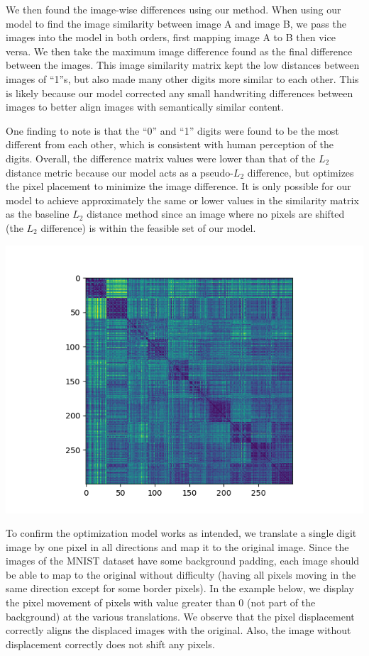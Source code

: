 \documentclass[11pt]{article}
\begin{document}
We then found the image-wise differences using our method. When using
our model to find the image similarity between image A and image B, we
pass the images into the model in both orders, first mapping image A to
B then vice versa. We then take the maximum image difference found as
the final difference between the images. This image similarity matrix
kept the low distances between images of ``1''s, but also made many
other digits more similar to each other. This is likely because our
model corrected any small handwriting differences between images to
better align images with semantically similar content.

One finding to note is that the ``0'' and ``1'' digits were found to be
the most different from each other, which is consistent with human
perception of the digits. Overall, the difference matrix values were
lower than that of the \(L_2\) distance metric because our model acts as
a pseudo-\(L_2\) difference, but optimizes the pixel placement to
minimize the image difference. It is only possible for our model to
achieve approximately the same or lower values in the similarity matrix
as the baseline \(L_2\) distance method since an image where no pixels
are shifted (the \(L_2\) difference) is within the feasible set of our
model.

\includegraphics{optimization_similarity_matrix.png}

To confirm the optimization model works as intended, we translate a
single digit image by one pixel in all directions and map it to the
original image. Since the images of the MNIST dataset have some
background padding, each image should be able to map to the original
without difficulty (having all pixels moving in the same direction
except for some border pixels). In the example below, we display the
pixel movement of pixels with value greater than 0 (not part of the
background) at the various translations. We observe that the pixel
displacement correctly aligns the displaced images with the original.
Also, the image without displacement correctly does not shift any
pixels.
\end{document}
